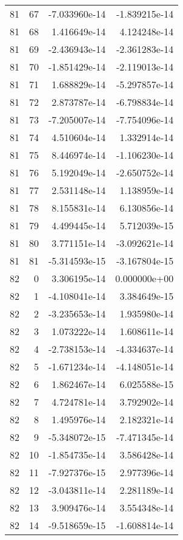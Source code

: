 \begin{tabular}{rrrr}
  81 &   67 & -7.033960e-14 & -1.839215e-14 \\
  81 &   68 &  1.416649e-14 &  4.124248e-14 \\
  81 &   69 & -2.436943e-14 & -2.361283e-14 \\
  81 &   70 & -1.851429e-14 & -2.119013e-14 \\
  81 &   71 &  1.688829e-14 & -5.297857e-14 \\
  81 &   72 &  2.873787e-14 & -6.798834e-14 \\
  81 &   73 & -7.205007e-14 & -7.754096e-14 \\
  81 &   74 &  4.510604e-14 &  1.332914e-14 \\
  81 &   75 &  8.446974e-14 & -1.106230e-14 \\
  81 &   76 &  5.192049e-14 & -2.650752e-14 \\
  81 &   77 &  2.531148e-14 &  1.138959e-14 \\
  81 &   78 &  8.155831e-14 &  6.130856e-14 \\
  81 &   79 &  4.499445e-14 &  5.712039e-15 \\
  81 &   80 &  3.771151e-14 & -3.092621e-14 \\
  81 &   81 & -5.314593e-15 & -3.167804e-15 \\
  82 &    0 &  3.306195e-14 &  0.000000e+00 \\
  82 &    1 & -4.108041e-14 &  3.384649e-15 \\
  82 &    2 & -3.235653e-14 &  1.935980e-14 \\
  82 &    3 &  1.073222e-14 &  1.608611e-14 \\
  82 &    4 & -2.738153e-14 & -4.334637e-14 \\
  82 &    5 & -1.671234e-14 & -4.148051e-14 \\
  82 &    6 &  1.862467e-14 &  6.025588e-15 \\
  82 &    7 &  4.724781e-14 &  3.792902e-14 \\
  82 &    8 &  1.495976e-14 &  2.182321e-14 \\
  82 &    9 & -5.348072e-15 & -7.471345e-14 \\
  82 &   10 & -1.854735e-14 &  3.586428e-14 \\
  82 &   11 & -7.927376e-15 &  2.977396e-14 \\
  82 &   12 & -3.043811e-14 &  2.281189e-14 \\
  82 &   13 &  3.909476e-14 &  3.554348e-14 \\
  82 &   14 & -9.518659e-15 & -1.608814e-14 \\

\end{tabular}
